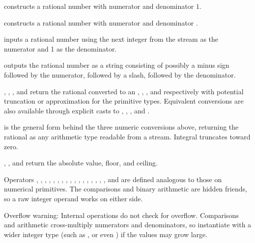 \begin{compactitem}
  \item {} constructs a rational number with numerator  and denominator $1$.
  \item {} constructs a rational number with numerator  and denominator .
  \item {} inputs a rational number using the next integer from the stream as the numerator and 1 as the denominator.
  \item {} outputs the rational number as a string consisting of possibly a minus sign followed by the numerator, followed by a slash, followed by the denominator.
  \item {}, , , and  return the rational converted to an , , , and  respectively with potential truncation or approximation for the primitive types. Equivalent conversions are also available through explicit casts to , , , and .
  \item {} is the general form behind the three numeric conversions above, returning the rational as any arithmetic type  readable from a stream. Integral  truncates toward zero.
  \item {}, , and  return the absolute value, floor, and ceiling.
  \item Operators \inlinecode{\textless{}}, \inlinecode{\textgreater{}}, \inlinecode{\textless{}=}, \inlinecode{\textgreater{}=}, \inlinecode{==}, \inlinecode{!=}, \inlinecode{+}, \inlinecode{-}, \inlinecode{*}, \inlinecode{/}, \inlinecode{\%}, \inlinecode{++}, \inlinecode{--}, \inlinecode{+=}, \inlinecode{-=}, \inlinecode{*=}, \inlinecode{/=}, and \inlinecode{\%=} are defined analogous to those on numerical primitives. The comparisons and binary arithmetic are hidden friends, so a raw integer operand works on either side.
\end{compactitem}

Overflow warning: Internal operations do not check for overflow. Comparisons and arithmetic cross-multiply numerators and denominators, so instantiate with a wider integer type (such as , or even ) if the values may grow large.

